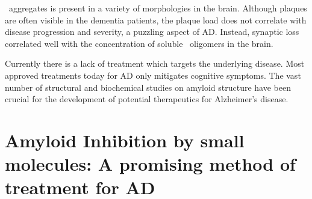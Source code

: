 
\abeta\ aggregates is present in a variety of morphologies in the brain. Although plaques are often visible in the dementia patients, the plaque load does not correlate with disease progression and severity, a puzzling aspect of AD.  Instead, synaptic loss correlated well with the concentration of soluble \abeta\ oligomers in the brain.

Currently there is a lack of treatment which targets the underlying disease. Most approved treatments today for AD only mitigates cognitive symptoms.  The vast number of structural and biochemical studies on amyloid structure have been crucial for the development of potential therapeutics for Alzheimer's disease.




\section{Amyloid Inhibition by small molecules: A promising method of treatment for AD}




